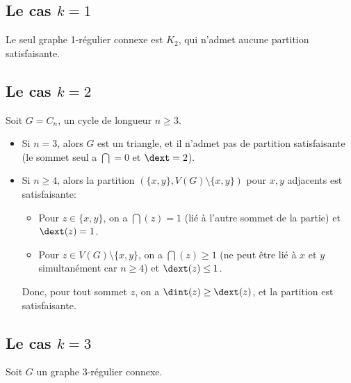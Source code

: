 \subsection{Le cas \(k = 1\)}\label{subsec:k1}

Le seul graphe 1-régulier connexe est \(K_2\), qui n'admet aucune partition satisfaisante.


\subsection{Le cas \(k = 2\)}\label{subsec:k2}

Soit \(G = C_n\), un cycle de longueur \(n \geq 3\).

\begin{itemize}
    \item Si \(n = 3\), alors \(G\) est un triangle, et il n'admet pas de partition satisfaisante (le sommet seul a \(\dint = 0\) et \(\dext = 2\)).

    \item Si \(n \geq 4\), alors la partition \((\{x,y\}, V(G) \setminus \{x,y\})\) pour \(x,y\) adjacents est satisfaisante:
    \begin{itemize}
        \item Pour \(z \in \{x,y\}\), on a \(\dint(z) = 1\) (lié à l'autre sommet de la partie) et \(\dext(z) = 1\).
        \item Pour \(z \in V(G) \setminus \{x,y\}\), on a \(\dint(z) \geq 1\) (ne peut être lié à \(x\) et \(y\) simultanément car \(n \geq 4\)) et \(\dext(z) \leq 1\).
    \end{itemize}
    Donc, pour tout sommet \(z\), on a \(\dint(z) \geq \dext(z)\), et la partition est satisfaisante.
\end{itemize}


\subsection{Le cas \(k = 3\)}\label{subsec:k3}

Soit \(G\) un graphe 3-régulier connexe.





%
%
%

